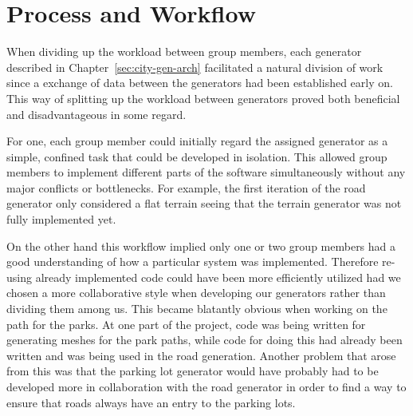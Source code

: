 \section{Process and Workflow}
When dividing up the workload between group members, each generator described in Chapter~\ref{sec:city-gen-arch} facilitated a natural division of work since a exchange of data between the generators had been established early on.
This way of splitting up the workload between generators proved both beneficial and disadvantageous in some regard.

For one, each group member could initially regard the assigned generator as a simple, confined task that could be developed in isolation.
This allowed group members to implement different parts of the software simultaneously without any major conflicts or bottlenecks.
For example, the first iteration of the road generator only considered a flat terrain seeing that the terrain generator was not fully implemented yet.

On the other hand this workflow implied only one or two group members had a good understanding of how a particular system was implemented.
Therefore re-using already implemented code could have been more efficiently utilized had we chosen a more collaborative style when developing our generators rather than dividing them among us.
This became blatantly obvious when working on the path for the parks.
At one part of the project, code was being written for generating meshes for the park paths, while code for doing this had already been written and was being used in the road generation. 
Another problem that arose from this was that the parking lot generator would have probably had to be developed more in collaboration with the road generator in order to find a way to ensure that roads always have an entry to the parking lots.

